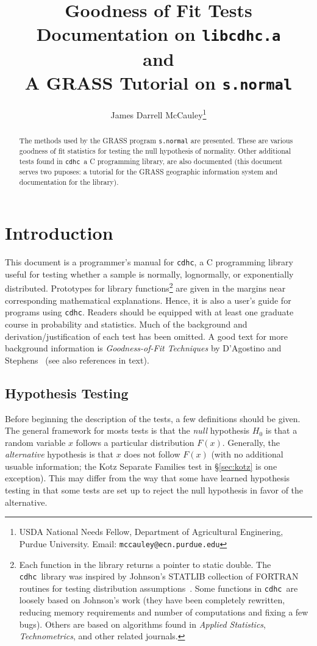 \documentclass[draft]{article}
\title{Goodness of Fit Tests\\
{\large Documentation on {\tt libcdhc.a}}\\
{\large and}\\
{\large A GRASS Tutorial on {\tt s.normal}}}
\author{James Darrell McCauley\thanks{USDA National Needs Fellow,
Department of Agricultural Enginering, Purdue University. Email:
{\tt mccauley@ecn.purdue.edu}}}
\def\libname{{\tt cdhc}}
\begin{document}

\maketitle

\begin{abstract}
The methods used by the GRASS program {\tt s.normal}
are presented. These are various goodness of fit statistics for testing
the null hypothesis of normality. Other additional tests found in
\libname\, a C programming library,
are also documented (this document serves two puposes:
a tutorial for the GRASS geographic information system
and documentation for the library).
\end{abstract}

\section{Introduction}

This document is a programmer's
manual for \libname, a C programming library useful
for testing whether a sample is normally, lognormally,
or exponentially distributed.
Prototypes for library functions\footnote{%
Each function in the library returns a pointer to static double.
The \libname\ library was inspired by Johnson's
STATLIB collection of FORTRAN routines for testing
distribution assumptions~\protect\cite{johnson94}.
Some functions in \libname\
are loosely based on Johnson's work (they have been completely
rewritten, reducing memory requirements and number
of computations and fixing a few bugs). Others are based on
algorithms found in \emph{Applied Statistics}, \emph{Technometrics},
and other related journals.}
are given in the margins near
corresponding mathematical explanations. Hence, it is also
a user's guide for programs using \libname.
Readers should be equipped with at least one graduate course
in probability and statistics. Much of the background
and derivation/justification of each test has been
omitted. A good text for more background information
is {\em Goodness-of-Fit Techniques\/} by
D'Agostino and Stephens~\cite{dagostino86b} (see also references in text).

\subsection{Hypothesis Testing}

Before beginning the description of the tests, a few definitions
should be given. The general framework for mosts tests is that
the {\em null\/} hypothesis \(H_0\) is that a random variable \(x\)
follows a particular distribution \(F\left(x\right)\).
Generally, the {\em alternative\/} hypothesis is that
\(x\) does not follow \(F\left(x\right)\) (with no additional
usuable information; the Kotz Separate Families test in \S\ref{sec:kotz}
is one exception).
This may differ from the way that some have learned hypothesis testing
in that some tests are set up to reject the null hypothesis in
favor of the alternative.
\end{document}
